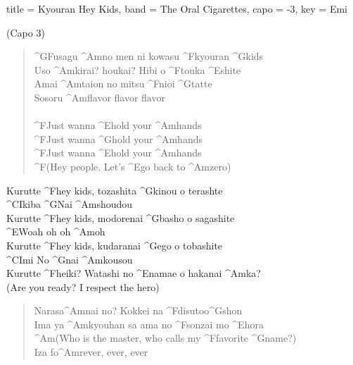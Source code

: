 \begin{song}[
	remember-chords = false ,
	verse/numbered = true ,
	transpose-capo = true 
	]{
		title = Kyouran Hey Kids,
		band = The Oral Cigarettes,
		capo = -3,
		key  = Emi
	}	

	(Capo 3)
	\begin{verse}
		
		^{G}Fusagu ^{Am}no men ni kowasu ^{F}kyouran ^{G}kids
\\
		Uso ^{Am}kirai? houkai? Hibi o ^{F}touka ^{E}shite
\\
		Amai ^{Am}taion no mitsu ^{F}nioi ^{G}tatte
\\
		Sosoru ^{Am}flavor flavor flavor
\\
		\\
		^{F}Just wanna ^{E}hold your ^{Am}hands
\\
		^{F}Just wanna ^{G}hold your ^{Am}hands
\\
		^{F}Just wanna ^{E}hold your ^{Am}hands
\\
		
		^{F}(Hey people. Let's ^{E}go back to ^{Am}zero)
\\
		
	\end{verse}
	\begin{chorus}
		
		Kurutte ^{F}hey kids, tozashita ^{G}kinou o terashte \\
		^{C}Ikiba ^{G}Nai ^{Am}shoudou \\
		Kurutte ^{F}hey kids, modorenai ^{G}basho o sagashite \\ 
		^{E}Woah oh oh ^{Am}oh \\
		Kurutte ^{F}hey kids, kudaranai ^{G}ego o tobashite \\
		^{C}Imi No ^{G}nai ^{Am}kousou \\
		Kurutte ^{F}heiki? Watashi no ^{E}namae o hakanai ^{Am}ka? \\
		(Are you ready? I respect the hero) \\
		
		
	\end{chorus}
	\begin{verse}
		
		Narasa^{Am}nai no? Kokkei na ^{F}disutoo^{G}shon \\
		Ima ya ^{Am}kyouhan sa ama no ^{F}sonzai mo ^{E}hora \\
		^{Am}(Who is the master, who calls my ^{F}favorite ^{G}name?) \\
		Iza fo^{Am}rever, ever, ever \\
				

\end{verse}
\end{song}

